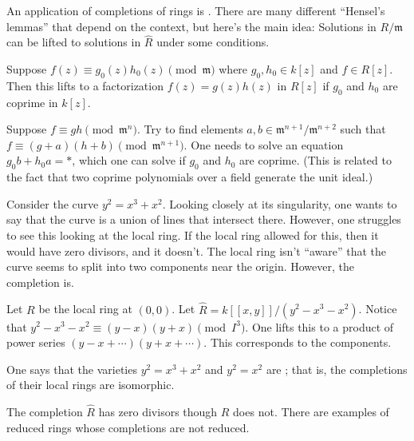 \documentclass [11 pt, oneside, margin = 1 in] {article}
\begin{document}
An application of completions of rings is . There are many different ``Hensel's lemmas'' that depend on the context, but here's the main idea: Solutions in $R/\mathfrak{m}$ can be lifted to solutions in $\widehat{R}$ under some conditions.

\begin{example}\label{}\text{}
Suppose $f(z)\equiv g_0(z) h_0(z)\pmod{\mathfrak{m}}$ where $g_0,h_0\in k[z]$ and $f\in R[z]$. Then this lifts to a factorization $f(z)=g (z)h (z)$ in $R[z]$ if $g_0$ and $h_0$ are coprime in $k[z]$.
\end{example}

\begin{esquisse}
	Suppose $f\equiv gh\pmod{\mathfrak{m}^n}$. Try to find elements $a,b\in \mathfrak{m}^{n+1}/\mathfrak{m}^{n+2}$ such that $f\equiv (g+a) (h+b)\pmod { \mathfrak{m}^{n+1}}$. One needs to solve an equation $g_0b+h_0a = *$, which one can solve if $g_0$ and $h_0$ are coprime. (This is related to the fact that two coprime polynomials over a field generate the unit ideal.)
\end{esquisse}

\begin{example}[ ]\label{}\text{}
Consider the curve $y^2 = x^3+x^2$. Looking closely at its singularity, one wants to say that the curve is a union of lines that intersect there. However, one struggles to see this looking at the local ring. If the local ring allowed for this, then it would have zero divisors, and it doesn't. The local ring isn't ``aware'' that the curve seems to split into two components near the origin. However, the completion is. 

Let $R$ be the local ring at $(0,0)$. Let $\widehat{R} = k [\![x,y]\!]/(y^2-x^3-x^2)$. Notice that $y^2-x^3-x^2\equiv (y-x) (y+x)\pmod {I^3}$. One lifts this to a product of power series $(y-x+\cdots) (y+x+\cdots)$. This corresponds to the components.
\end{example}

\begin{remark}
	One says that the varieties $y^2=x^3+x^2$ and $y^2=x^2$ are ; that is, the completions of their local rings are isomorphic.
\end{remark}

\begin{remark}
	The completion $\widehat{R}$ has zero divisors though $R$ does not. There are examples of reduced rings whose completions are not reduced.
\end{remark}
\end{document}
